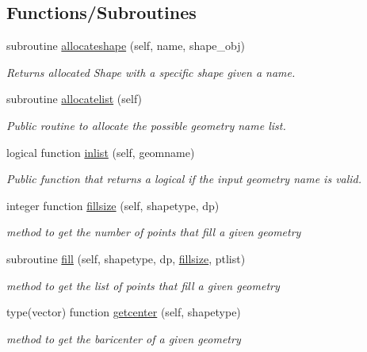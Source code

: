 \subsection*{Functions/\+Subroutines}
\begin{DoxyCompactItemize}
\item 
subroutine \mbox{\hyperlink{namespacegeometry__mod_a571a294c2a1869259d21267005c32025}{allocateshape}} (self, name, shape\+\_\+obj)
\begin{DoxyCompactList}\small\item\em Returns allocated Shape with a specific shape given a name. \end{DoxyCompactList}\item 
subroutine \mbox{\hyperlink{namespacegeometry__mod_a1b6f259b0b6be71e02ffae7670f7d8ba}{allocatelist}} (self)
\begin{DoxyCompactList}\small\item\em Public routine to allocate the possible geometry name list. \end{DoxyCompactList}\item 
logical function \mbox{\hyperlink{namespacegeometry__mod_a22dd77024fce56da299445a697256155}{inlist}} (self, geomname)
\begin{DoxyCompactList}\small\item\em Public function that returns a logical if the input geometry name is valid. \end{DoxyCompactList}\item 
integer function \mbox{\hyperlink{namespacegeometry__mod_ad790edd694561b33dad20cfa3a14e8f2}{fillsize}} (self, shapetype, dp)
\begin{DoxyCompactList}\small\item\em method to get the number of points that fill a given geometry \end{DoxyCompactList}\item 
subroutine \mbox{\hyperlink{namespacegeometry__mod_a1d97564e04562532b5389bfb91aa676b}{fill}} (self, shapetype, dp, \mbox{\hyperlink{namespacegeometry__mod_ad790edd694561b33dad20cfa3a14e8f2}{fillsize}}, ptlist)
\begin{DoxyCompactList}\small\item\em method to get the list of points that fill a given geometry \end{DoxyCompactList}\item 
type(vector) function \mbox{\hyperlink{namespacegeometry__mod_a4a38edbff02aa0ff5f16a16c39bf778e}{getcenter}} (self, shapetype)
\begin{DoxyCompactList}\small\item\em method to get the baricenter of a given geometry \end{DoxyCompactList}\item 

\end{DoxyCompactItemize}
